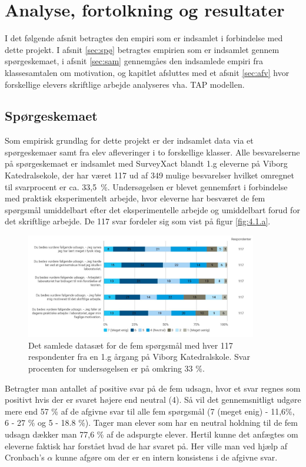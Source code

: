 \chapter{Analyse, fortolkning og resultater}
\label{Ch:4}

I det følgende afsnit betragtes den empiri som er indsamlet i forbindelse med dette projekt.  I afsnit \vref{sec:spø} betragtes empirien som er indsamlet gennem spørgeskemaet, i afsnit \vref{sec:sam} gennemgåes den indsamlede empiri fra klassesamtalen om motivation, og kapitlet afsluttes med et afsnit \vref{sec:afv} hvor forskellige elevers skriftlige arbejde analyseres vha. TAP modellen.

\section{Spørgeskemaet}
\label{sec:spø}
Som empirisk grundlag for dette projekt er der indsamlet data via et spørgeskemaer samt fra elev afleveringer i to forskellige klasser. Alle besvarelserne på spørgeskemaet er indsamlet med SurveyXact blandt 1.g eleverne på Viborg Katedralsekole, der har været 117 ud af 349 mulige besvarelser hvilket omregnet til svarprocent er ca. \mbox{33,5 \%}. Undersøgelsen er blevet gennemført i forbindelse med praktisk eksperimentelt arbejde, hvor eleverne har besværet de fem spørgsmål umiddelbart efter det eksperimentelle arbejde og umiddelbart forud for det skriftlige arbejde. De 117 svar fordeler sig som vist på figur \vref{fig:4.1.a}. 

\begin{figure}[h!]
	\centering
	\includegraphics[width=0.9\textwidth]{Figs/Sammenlign}
	\caption[Spørgeskema resultater]{Det samlede datasæt for de fem spørgsmål med hver 117 respondenter fra en 1.g årgang på Viborg Katedralskole. Svar procenten for undersøgelsen er på omkring 33 \%. }
	\label{fig:4.1.a}
\end{figure}
Betragter man antallet af positive svar på de fem udsagn, hvor et svar regnes som positivt hvis der er svaret højere end neutral (4). Så vil det gennemsnitligt udgøre mere end 57 \% af de afgivne svar til alle fem spørgsmål (7 (meget enig) - 11,6\%, 6 - 27 \% og 5 - 18.8 \%).   Tager man elever som har en neutral holdning til de fem udsagn dækker man 77,6 \% af de adspurgte elever. Hertil kunne det anfægtes om eleverne faktisk har forstået hvad de har svaret på. Her ville man ved hjælp af Cronbach's $\alpha$ kunne afgøre om der er en intern konsistens i de afgivne svar.

